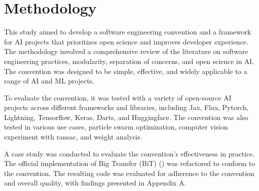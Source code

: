 


\section{Methodology}

This study aimed to develop a software engineering convention and a framework for AI projects that prioritizes open science and improves developer experience. The methodology involved a comprehensive review of the literature on software engineering practices, modularity, separation of concerns, and open science in AI. The convention was designed to be simple, effective, and widely applicable to a range of AI and ML projects.

To evaluate the convention, it was tested with a variety of open-source AI projects across different frameworks and libraries, including Jax, Flax, Pytorch, Lightning, Tensorflow, Keras, Darts, and Huggingface. The convention was also tested in various use cases, particle swarm optimization, computer vision experiment with ransac, and weight analysis. 

A case study was conducted to evaluate the convention's effectiveness in practice. The official implementation of Big Transfer (BiT)  (\cite{transferlearning}) was refactored to conform to the convention. The resulting code was evaluated for adherence to the convention and overall quality, with findings presented in Appendix A.







